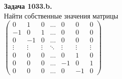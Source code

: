 \documentclass[a4paper, 12pt]{article}
\newenvironment{problem}[2][Задача]
    { \begin{mdframed}[backgroundcolor=gray!10] \textbf{#1 #2.} \\}
    {  \end{mdframed}}
\begin{document}
\begin{problem}{1033.b}
Найти собственные значения матрицы\\
$\left( \begin{array}{rrrrrrr}0 & 1 & 0 & \ldots & 0 & 0 & 0\\ -1 & 0 & 1 & \ldots & 0 & 0 & 0 \\ 0 & -1 & 0 & \ldots & 0 & 0 & 0 \\ \vdots & \vdots & \vdots & \ddots & \vdots & \vdots & \vdots \\ 0 & 0 & 0 & \ldots & 0 & 1 & 0 \\ 0 & 0 & 0 & \ldots & -1 & 0 & 1 \\ 0 & 0 & 0 & \ldots & 0 & -1 & 0 \end{array} \right)$

\end{problem}
\end{document}
